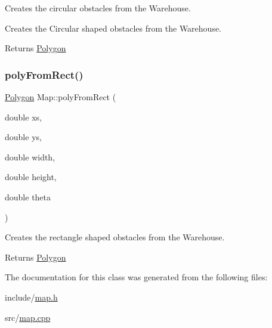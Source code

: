 Creates the circular obstacles from the Warehouse. 

Creates the Circular shaped obstacles from the Warehouse.

\begin{DoxyReturn}{Returns}
\hyperlink{class_polygon}{Polygon} 
\end{DoxyReturn}
\mbox{\label{class_map_aabf78e889bf59df6b06f0a63ccb144f9}} 
\subsubsection{\texorpdfstring{poly\+From\+Rect()}{polyFromRect()}}
{\footnotesize\ttfamily \hyperlink{class_polygon}{Polygon} Map\+::poly\+From\+Rect (\begin{DoxyParamCaption}\item[{double}]{xs,  }\item[{double}]{ys,  }\item[{double}]{width,  }\item[{double}]{height,  }\item[{double}]{theta }\end{DoxyParamCaption})}



Creates the rectangle shaped obstacles from the Warehouse. 

\begin{DoxyReturn}{Returns}
\hyperlink{class_polygon}{Polygon} 
\end{DoxyReturn}


The documentation for this class was generated from the following files\+:\begin{DoxyCompactItemize}
\item 
include/\hyperlink{map_8h}{map.\+h}\item 
src/\hyperlink{map_8cpp}{map.\+cpp}\end{DoxyCompactItemize}
